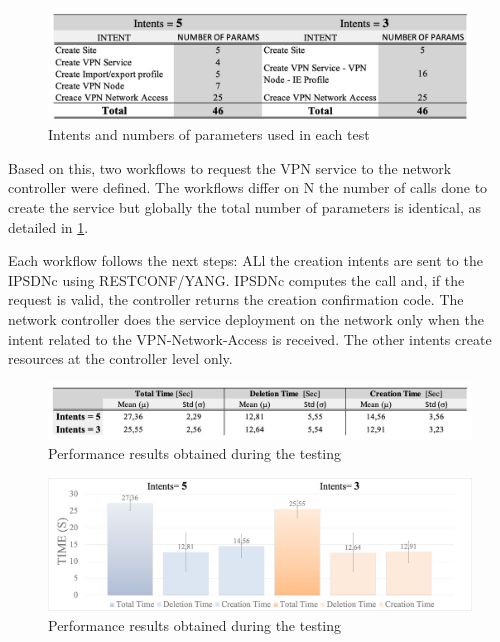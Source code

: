 \documentclass[conference]{IEEEtran}
\begin{document}
\begin{figure}
	\centering
		\includegraphics[width=\linewidth]{figure41.png}
	\caption{Intents and numbers of parameters used in each test}
	\label{FIG:4}
\end{figure}

Based on this, two workflows to request the VPN service to the network controller were defined. The workflows differ on N the number of calls done to create the service but globally the total number of parameters is identical, as detailed in \cref{FIG:4}.

Each workflow follows the next steps:  ALl the creation intents are sent to the IPSDNc using RESTCONF/YANG. IPSDNc computes the call and, if the request is valid, the controller returns the creation confirmation code. The network controller does the service deployment on the network only when the intent related to the VPN-Network-Access is received. The other intents create resources at the controller level only.

\begin{figure}
	\centering
		\includegraphics[width=\linewidth]{figure51.png}
	\caption{Performance results obtained during the testing}
	\label{FIG:5}
\end{figure}

\begin{figure}
	\centering
		\includegraphics[width=\linewidth]{figure62.png}
	\caption{Performance results obtained during the testing}
	\label{FIG:6}
\end{figure}
\end{document}
